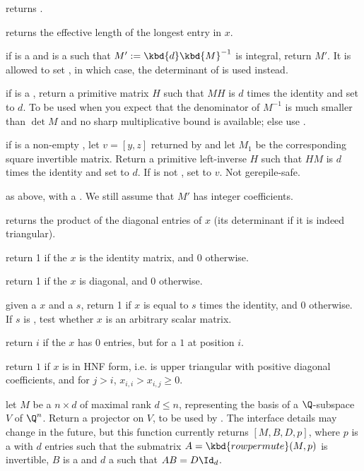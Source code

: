  returns .

 returns the effective length of the longest
entry in $x$.

 if  is a  and 
is a  such that $M' := \kbd{d}\kbd{M}^{-1}$ is integral,
return $M'$. It is allowed to set , in which case, the
determinant of  is used instead.

 if  is a ,
return a primitive matrix $H$ such that $M H$ is $d$ times the identity
and set  to $d$. To be used when you expect that the denominator
of $M^{-1}$ is much smaller than $\det M$ and no sharp multiplicative
bound is available; else use .

 if  is a non-empty
, let $v = [y,z]$ returned by  and
let $M_1$ be the corresponding square invertible matrix.
Return a primitive left-inverse $H$ such that $H M$ is
$d$ times the identity and set  to $d$. If  is not
, set  to $v$. Not gerepile-safe.

 as above, with  a . We
still assume that $M'$ has integer coefficients.

 returns the product of the diagonal
entries of $x$ (its determinant if it is indeed triangular).

 return 1 if the  $x$ is the
identity matrix, and 0 otherwise.

 return 1 if the  $x$ is diagonal,
and 0 otherwise.

 given a  $x$ and a
 $s$, return 1 if $x$ is equal to $s$ times the identity, and 0
otherwise. If $s$ is , test whether $x$ is an arbitrary scalar
matrix.

 return $i$ if the  $x$ has $0$ entries,
but for a $1$ at position $i$.

 return $1$ if $x$ is in HNF form, i.e. is upper
triangular with positive diagonal coefficients, and  for $j>i$,
$x_{i,i}>x_{i,j} \ge 0$.

 let $M$ be a  $n\times d$  of
maximal rank $d \leq n$, representing the basis of a $\Q$-subspace
$V$ of $\Q^n$. Return a projector on $V$, to be used by .
The interface details may change in the future, but this function currently
returns $[M, B,D,p]$, where $p$ is a  with $d$ entries
such that the submatrix $A = \kbd{rowpermute}(M,p)$ is invertible, $B$ is a
 and $d$ a  such that $A B = D \Id_d$.

